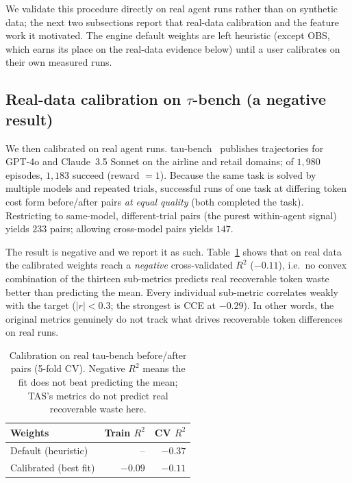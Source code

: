 \documentclass[11pt]{article}
\begin{document}
We validate this procedure directly on real agent runs rather than on synthetic
data; the next two subsections report that real-data calibration and the feature
work it motivated. The engine default weights are left heuristic (except OBS,
which earns its place on the real-data evidence below) until a user calibrates on
their own measured runs.

\subsection{Real-data calibration on \texorpdfstring{$\tau$}{tau}-bench (a negative result)}
\label{sec:realcalib}
We then calibrated on real agent runs. tau-bench~\cite{taubench} publishes
trajectories for GPT-4o and Claude~3.5 Sonnet on the airline and retail domains;
of $1{,}980$ episodes, $1{,}183$ succeed (reward $=1$). Because the same task is
solved by multiple models and repeated trials, successful runs of one task at
differing token cost form before/after pairs \emph{at equal quality} (both
completed the task). Restricting to same-model, different-trial pairs (the purest
within-agent signal) yields $233$ pairs; allowing cross-model pairs yields $147$.

The result is negative and we report it as such. Table~\ref{tab:realcalib} shows
that on real data the calibrated weights reach a \emph{negative} cross-validated
$R^2$ ($-0.11$), i.e.\ no convex combination of the thirteen sub-metrics predicts
real recoverable token waste better than predicting the mean. Every individual
sub-metric correlates weakly with the target ($|r|<0.3$; the strongest is CCE at
$-0.29$). In other words, the original metrics genuinely do not track what drives
recoverable token differences on real runs.

\begin{table}[t]
\centering
\caption{Calibration on real tau-bench before/after pairs (5-fold CV). Negative
$R^2$ means the fit does not beat predicting the mean; TAS's metrics do not
predict real recoverable waste here.}
\label{tab:realcalib}
\begin{tabular}{lrr}
\toprule
Weights & Train $R^2$ & CV $R^2$ \\
\midrule
Default (heuristic)    & --     & $-0.37$ \\
Calibrated (best fit)  & $-0.09$ & $-0.11$ \\
\bottomrule
\end{tabular}
\end{table}
\end{document}
